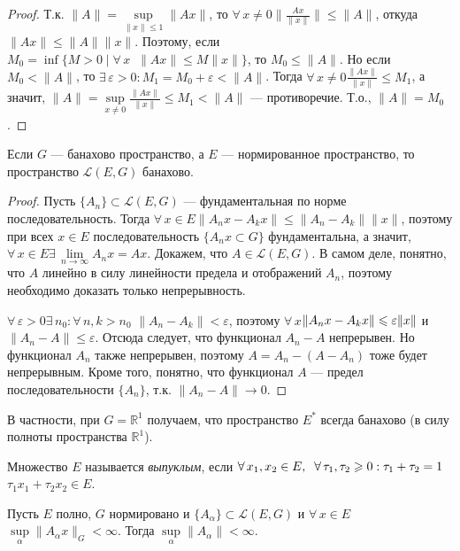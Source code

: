 \documentclass[12pt,titlepage, a4paper]{article}
\begin{document}
\begin{proof}
Т.к. $\|A\|=\sup\limits_{\|x\|\leqslant 1}\|Ax\|$, то
$\forall\,x\neq 0$\;\;$\Big\|\frac{Ax}{\|x\|}\Big\|\leqslant\|A\|$,
откуда $\|Ax\|\leqslant\|A\|\|x\|$. Поэтому, если $M_0=\inf\{M>0\mid
\forall\,x\;\;\|Ax\|\leqslant M\|x\|\}$, то $M_0\leqslant\|A\|$. Но
если $M_0<\|A\|$, то
$\exists\,\varepsilon>0:M_1=M_0+\varepsilon<\|A\|$. Тогда
$\forall\,x\neq 0$\;\;$\frac{\|Ax\|}{\|x\|}\leqslant M_1$, а значит,
$\|A\|=\sup\limits_{x\neq0}\frac{\|Ax\|}{\|x\|}\leqslant M_1<\|A\|$
--- противоречие. Т.о., $\|A\|=M_0$.
\end{proof}

\begin{theorem}
Если $G$ --- банахово пространство, а $E$ --- нормированное
пространство, то пространство $\mathcal{L}(E,G)$ банахово.
\end{theorem}

\begin{proof}
Пусть $\{A_n\}\subset\mathcal{L}(E,G)$ --- фундаментальная по норме
последовательность. Тогда $\forall\,x\in
E$\;\;$\|A_nx-A_kx\|\leqslant \|A_n-A_k\|\|x\|$, поэтому при всех
$x\in E$ последовательность $\{A_nx\subset G\}$ фундаментальна, а
значит, $\forall\,x\in E$\;\;$\exists\,\lim\limits_{n\to\infty}
A_nx=Ax$. Докажем, что $A\in\mathcal{L}(E,G)$. В самом деле,
понятно, что $A$ линейно в силу линейности предела и отображений
$A_n$, поэтому необходимо доказать только непрерывность.

$\forall\,\varepsilon>0$\;\;$\exists\,n_0:\forall\,n,k>n_0$\;\;
$\|A_n-A_k\|<\varepsilon$, поэтому
$\forall\,x$\;\;$\|A_nx-A_kx\|\p\leqslant\varepsilon\|x\|$ и
$\|A_n-A\|\leqslant\varepsilon$. Отсюда следует, что функционал
$A_n-A$ непрерывен. Но функционал $A_n$ также непрерывен, поэтому
$A=A_n-(A-A_n)$ тоже будет непрерывным. Кроме того, понятно, что
функционал $A$ --- предел последовательности $\{A_n\}$, т.к.
$\|A_n-A\|\to 0$.
\end{proof}

В частности, при $G=\mathbb{R}^1$ получаем, что пространство $E^*$
всегда банахово (в силу полноты пространства $\mathbb{R}^1$).

\begin{defen}
Множество $E$ называется \emph{выпуклым}, если
$\forall\,x_1,x_2\p\in
E,\;\;\forall\,\tau_1,\tau_2\geqslant0:\tau_1+\tau_2=1$\;\;$\tau_1x_1+\tau_2x_2\in
E$.
\end{defen}

\begin{theorem}
Пусть $E$ полно, $G$ нормировано и
$\{A_\alpha\}\subset\mathcal{L}(E,G)$ и $\forall\,x\in E$
\;\;$\sup\limits_\alpha\|A_\alpha x\|_G<\infty$. Тогда
$\sup\limits_\alpha\|A_\alpha\|<\infty$.
\end{theorem}
\end{document}
